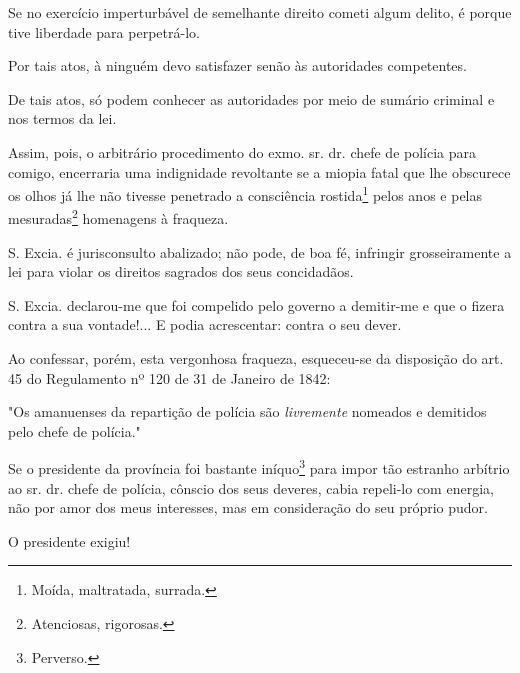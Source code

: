 Se no exercício imperturbável de semelhante direito cometi algum delito,
é porque tive liberdade para perpetrá-lo.

Por tais atos, à ninguém devo satisfazer senão às autoridades
competentes.

De tais atos, só podem conhecer as autoridades por meio de sumário
criminal e nos termos da lei.

Assim, pois, o arbitrário procedimento do exmo. sr. dr. chefe de polícia
para comigo, encerraria uma indignidade revoltante se a miopia fatal que
lhe obscurece os olhos já lhe não tivesse penetrado a consciência
rostida\footnote{Moída, maltratada, surrada.} pelos anos e pelas
mesuradas\footnote{Atenciosas, rigorosas.} homenagens à fraqueza.

S. Excia. é jurisconsulto abalizado; não pode, de boa fé, infringir
grosseiramente a lei para violar os direitos sagrados dos seus
concidadãos.

S. Excia. declarou-me que foi compelido pelo governo a demitir-me e que
o fizera contra a sua vontade!... E podia acrescentar: contra o seu
dever.

Ao confessar, porém, esta vergonhosa fraqueza, esqueceu-se da disposição
do art. 45 do Regulamento nº 120 de 31 de Janeiro de 1842:

"Os amanuenses da repartição de polícia são \emph{livremente} nomeados e
demitidos pelo chefe de polícia."

Se o presidente da província foi bastante iníquo\footnote{Perverso.}
para impor tão estranho arbítrio ao sr. dr. chefe de polícia, cônscio
dos seus deveres, cabia repeli-lo com energia, não por amor dos meus
interesses, mas em consideração do seu próprio pudor.

O presidente exigiu!

